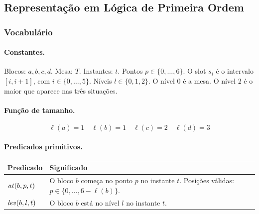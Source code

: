 \subsection{Representação em Lógica de Primeira Ordem}

\subsubsection{Vocabulário}

\paragraph{Constantes.}
Blocos: $a,b,c,d$. Mesa: $T$. Instantes: $t$.
Pontos $p\in\{0,\dots,6\}$. O slot $s_i$ é o intervalo $[i,i+1]$, com $i\in\{0,\dots,5\}$.
Níveis $l\in\{0,1,2\}$. O nível 0 é a mesa. O nível 2 é o maior que aparece nas três situações.

\paragraph{Função de tamanho.}
\[
\ell(a)=1\quad \ell(b)=1\quad \ell(c)=2\quad \ell(d)=3
\]

\paragraph{Predicados primitivos.}
\begin{center}
\begin{tabular}{p{3.2cm} p{10cm}}
\toprule
Predicado & Significado \\
\midrule
$\mathit{at}(b,p,t)$  & O bloco $b$ começa no ponto $p$ no instante $t$. Posições válidas: $p\in\{0,\dots,6-\ell(b)\}$. \\
$\mathit{lev}(b,l,t)$ & O bloco $b$ está no nível $l$ no instante $t$. \\
\bottomrule
\end{tabular}
\end{center}

